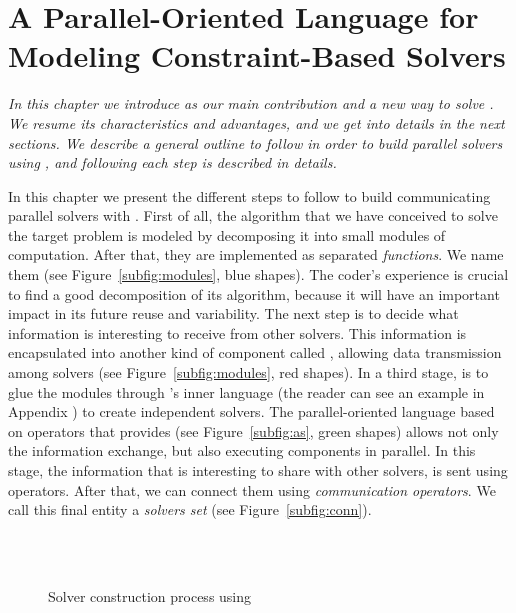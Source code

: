 \chapter{A Parallel-Oriented Language for Modeling Constraint-Based Solvers}
\label{chap:posl}
\textit{In this chapter we introduce \posl{} as our main contribution and a new way to solve \csps{}. We resume its characteristics and advantages, and we get into details in the next sections. We describe a general outline to follow in order to build parallel solvers using \posl, and following each step is described in details.}
\vfill
\minitoc
\newpage

In this chapter we present the different steps to follow to build communicating parallel solvers with \posl. 
First of all, the algorithm that we have conceived to solve the target problem is modeled by decomposing it into small modules of computation. After that, they are implemented as separated {\it functions}. We name them \oms{} (see Figure~\ref{subfig:modules}, blue shapes). The coder's experience is crucial to find a good decomposition of its algorithm, because it will have an important impact in its future reuse and variability. The next step is to decide what information is interesting to receive from other solvers. This information is encapsulated into another kind of component called \opch, allowing data transmission among solvers (see Figure~\ref{subfig:modules}, red shapes).
In a third stage, is to glue the modules through \posl{}'s inner language (the reader can see an example in Appendix \tet{[...]}) to create independent solvers.
The parallel-oriented language based on operators that \posl{} provides (see Figure~\ref{subfig:as}, green shapes) allows not only the information exchange, but also executing components in parallel. In this stage, the information that is interesting to share with other solvers, is sent using operators. After that, we can connect them using {\it communication operators}. We call this final entity a {\it solvers set} (see Figure~\ref{subfig:conn}).

\begin{figure}[h]
	\centering
	\\
	\\
	\caption[]{Solver construction process using \posl}
	\label{fig:posl}
\end{figure}

